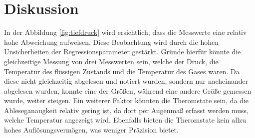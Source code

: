 \section{Diskussion}
\label{sec:Diskussion}
In der Abbildung \ref{fig:tiefdruck} wird ersichtlich, dass die Messwerte eine relativ hohe Abweichung aufweisen.
Diese Beobachtung wird durch die hohen Unsicherheiten der Regressionsparameter gestärkt.
Gründe hierfür könnte die gleichzeitige Messung von drei Messwerten sein, welche der Druck, die Temperatur des flüssigen Zustands und die Temperatur des Gases 
waren.
Da diese nicht gleichzeitig abgelesen und notiert wurden, sondern nur nacheinander abgelesen wurden, konnte eine der Größen, während eine andere Größe gemessen wurde,
weiter steigen.
Ein weiterer Faktor könnten die Theromstate sein, da die Ableseganaugkeit relativ gering ist, da dort per Augenmaß erfasst werden muss, welche Temperatur angezeigt wird.
Ebenfalls bieten die Theromstate kein allzu hohes Auflösungsvermögen, was weniger Präzision bietet. 